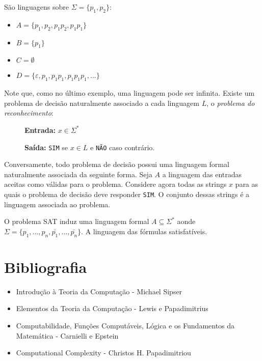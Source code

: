 \begin{example}
São linguagens sobre $\Sigma = \{p_1, p_2\}$:
\begin{itemize}
\item[] $A = \{p_1, p_2, p_1p_2, p_1p_1\}$
\item[] $B = \{p_1\}$
\item[] $C = \emptyset$
\item[] $D = \{\varepsilon, p_1, p_1p_1, p_1p_1p_1, \dots\}$
\end{itemize}
\end{example}

Note que, como no último exemplo, uma linguagem pode ser infinita.
Existe um problema de decisão naturalmente associado a cada linguagem $L$, o {\em problema do reconhecimento}:

\begin{description}
\item[] {\bf Entrada:} $x \in \Sigma^*$
\item[] {\bf Saída:} {\tt SIM} se $x \in L$ e {\tt NÃO} caso contrário.
\end{description}

Conversamente, todo problema de decisão possui uma linguagem formal naturalmente associada da seguinte forma.
Seja $A$ a linguagem das entradas aceitas como válidas para o problema.
Considere agora todas as strings $x$ para as quais o problema de decisão deve responder {\tt SIM}.
O conjunto dessas strings é a linguagem associada ao problema.

\begin{example}
O problema SAT induz uma linguagem formal $A \subseteq \Sigma^*$ aonde $\Sigma = \{p_1, \dots, p_n, \bar{p_1}, \dots, \bar{p_n}\}$.
A linguagem das fórmulas satisfatíveis.
\end{example}



\section{Bibliografia}
\label{sec:biblio}

\begin{itemize}
\item Introdução à Teoria da Computação - Michael Sipser
\item Elementos da Teoria da Computação - Lewis e Papadimitrius
\item Computabilidade, Funções Computáveis, Lógica e os Fundamentos da Matemática - Carnielli e Epstein
\item Computational Complexity - Christos H. Papadimitriou
\end{itemize}
